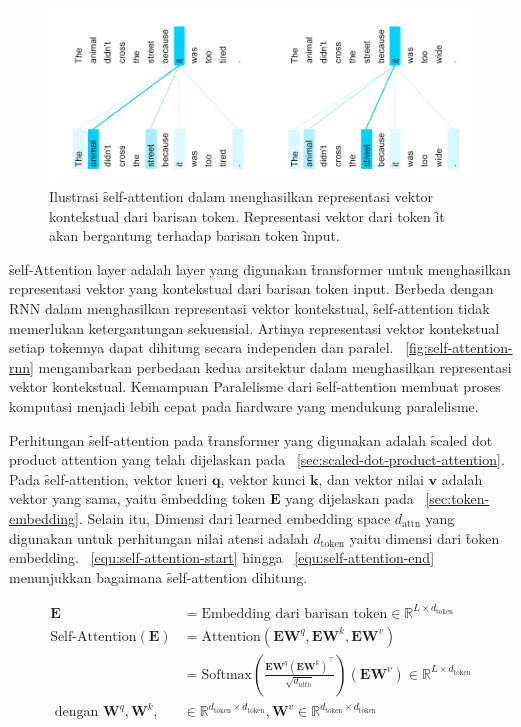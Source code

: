 	\begin{figure}
		\centering
		\includegraphics[width=1\textwidth]{assets/pics/self-attn-example.png}
		\caption{Ilustrasi \f{self-attention} dalam menghasilkan representasi vektor kontekstual dari barisan token. Representasi vektor dari token \f{it} akan bergantung terhadap barisan token \f{input}.}
		\label{fig:self-attention-example}
	\end{figure}

	\f{self-Attention layer} adalah layer yang digunakan \f{transformer} untuk menghasilkan representasi vektor yang kontekstual dari barisan token input. Berbeda dengan RNN dalam menghasilkan representasi vektor kontekstual, \f{self-attention} tidak memerlukan ketergantungan sekuensial. Artinya representasi vektor kontekstual setiap tokennya dapat dihitung secara independen dan paralel. \pic~\ref{fig:self-attention-rnn} mengambarkan perbedaan kedua arsitektur dalam menghasilkan representasi vektor kontekstual. Kemampuan Paralelisme dari \f{self-attention} membuat proses komputasi menjadi lebih cepat pada \f{hardware} yang mendukung paralelisme. 

	Perhitungan \f{self-attention} pada \f{transformer} yang digunakan adalah \f{scaled dot product attention} yang telah dijelaskan pada \sect~\ref{sec:scaled-dot-product-attention}. Pada \f{self-attention}, vektor kueri $\mathbf{q}$, vektor kunci $\mathbf{k}$, dan vektor nilai $\mathbf{v}$ adalah vektor yang sama, yaitu \f{embedding} token $\mathbf{E}$ yang dijelaskan pada \sect~\ref{sec:token-embedding}. Selain itu, Dimensi dari \f{learned embedding space} $d_{\text{attn}}$ yang digunakan untuk perhitungan nilai atensi adalah $d_{\text{token}}$ yaitu dimensi dari \f{token embedding}. \equ~\ref{equ:self-attention-start} hingga \equ~\ref{equ:self-attention-end} menunjukkan bagaimana \f{self-attention} dihitung.
	
	
	\begin{align}
		\label{equ:self-attention-start}
		\mathbf{E} &= \text{Embedding dari barisan token} \in \mathbb{R}^{L \times d_{\text{token}}} \\
		\text{Self-Attention}(\mathbf{E}) &= \text{Attention}(\mathbf{EW}^q, \mathbf{EW}^k, \mathbf{EW}^v) \\
		\label{equ:self-attention-end}
		&= \text{Softmax}(\frac{\mathbf{E} \mathbf{W}^q (\mathbf{E} \mathbf{W}^k)^{\top}}{\sqrt{d_{attn}}}) (\mathbf{E} \mathbf{W}^v) \in \mathbb{R}^{L \times d_{\text{token}}} \\
		\text{ dengan } \mathbf{W}^q, \mathbf{W}^k, &\in \mathbb{R}^{d_{\text{token}} \times d_{\text{token}}}, \mathbf{W}^v \in \mathbb{R}^{d_{\text{token}} \times d_{\text{token}}}
	\end{align}

